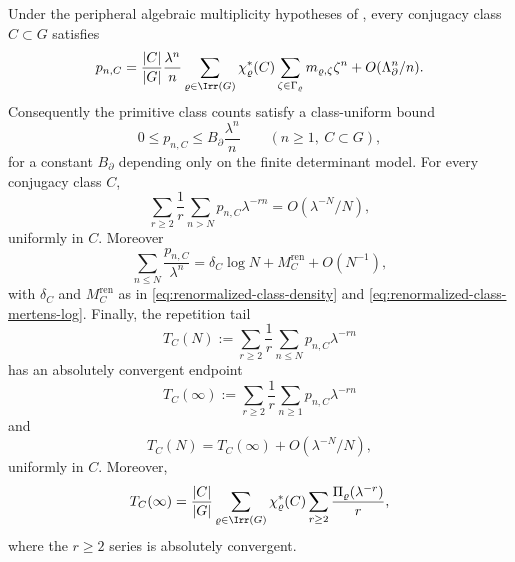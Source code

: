 \begin{lemma}
  \label{lem:perron-boundary-product-tail-reduction}
  Under the peripheral algebraic multiplicity hypotheses of
  ,
  every conjugacy class \(C\subset G\) satisfies
  \begin{equation}\label{eq:perron-boundary-tail-class-expansion}
    p_{n,C}
    =
    \frac{|C|}{|G|}
    \frac{\lambda^n}{n}
      \sum_{\varrho\in\Irr(G)}
        \chi_\varrho^\ast(C)
        \sum_{\zeta\in\Gamma_\varrho}
          m_{\varrho,\zeta}\zeta^n
    +O(\Lambda_\partial^n/n).
  \end{equation}
  Consequently the primitive class counts satisfy a class-uniform bound
  \begin{equation}\label{eq:perron-boundary-primitive-class-bound}
    0\le p_{n,C}\le B_{\partial}\frac{\lambda^n}{n}
    \qquad(n\ge1,\ C\subset G),
  \end{equation}
  for a constant \(B_{\partial}\) depending only on the finite determinant
  model.  For every conjugacy class \(C\),
  \begin{equation}\label{eq:perron-boundary-product-tail-omitted}
    \sum_{r\ge2}\frac1r\sum_{n>N}p_{n,C}\lambda^{-rn}
    =
    O(\lambda^{-N}/N),
  \end{equation}
  uniformly in \(C\).  Moreover
  \begin{equation}\label{eq:perron-boundary-tail-class-mertens}
    \sum_{n\le N}\frac{p_{n,C}}{\lambda^n}
    =
    \delta_C\log N+M_C^{\mathrm{ren}}+O(N^{-1}),
  \end{equation}
  with \(\delta_C\) and \(M_C^{\mathrm{ren}}\) as in
  \eqref{eq:renormalized-class-density} and
  \eqref{eq:renormalized-class-mertens-log}.
  Finally, the repetition tail
  \[
    T_C(N):=
      \sum_{r\ge2}\frac1r\sum_{n\le N}p_{n,C}\lambda^{-rn}
  \]
  has an absolutely convergent endpoint
  \[
    T_C(\infty):=
      \sum_{r\ge2}\frac1r\sum_{n\ge1}p_{n,C}\lambda^{-rn}
  \]
  and
  \begin{equation}\label{eq:perron-boundary-product-tail-truncation}
    T_C(N)=T_C(\infty)+O(\lambda^{-N}/N),
  \end{equation}
  uniformly in \(C\).  Moreover,
  \begin{equation}\label{eq:perron-boundary-product-tail-fourier}
    T_C(\infty)
    =
    \frac{|C|}{|G|}
      \sum_{\varrho\in\Irr(G)}
        \chi_\varrho^\ast(C)
        \sum_{r\ge2}\frac{\Pi_\varrho(\lambda^{-r})}{r},
  \end{equation}
  where the \(r\ge2\) series is absolutely convergent.
\end{lemma}

